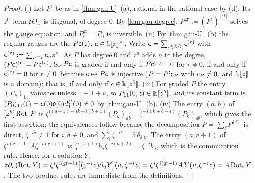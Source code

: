 \begin{proof}
(i) Let $P^\natural$ be as in \cref{thm:gau-U}~(a), rational in the rational case by (d). Its $z^0$-term $\mathfrak d\Theta_U$ is diagonal, of degree $0$. By \cref{lem:gau-degree}, $P^{\mathrm{gr}}:=(P^\natural)^{[0]}$ solves the gauge equation, and $P^{\mathrm{gr}}_0=P^\natural_0$ is invertible. (ii) By \cref{thm:gau-U}~(b) the regular gauges are the $P\mathsf{c}(z)$, $\mathsf{c}\in\Bbbk[\![ z ]\!]^\times$. Write $\mathsf{c}=\sum_{r\in\mathbb{Z}/5}\mathsf{c}^{(r)}$ with $\mathsf{c}^{(r)}:=\sum_{n\equiv r}\mathsf{c}_nz^n$. As $P$ has degree $0$ and $z^n$ adds $n$ to the degree, $(P\mathsf{c})^{[r]}=P\mathsf{c}^{(r)}$. So $P\mathsf{c}$ is graded if and only if $P\mathsf{c}^{(r)}=0$ for $r\neq0$, if and only if $\mathsf{c}^{(r)}=0$ for $r\neq0$, because $\mathsf{c}\mapsto P\mathsf{c}$ is injective ($P=P^\natural\mathsf{c}_P$ with $\mathsf{c}_P\neq0$, and $\Bbbk[\![ z ]\!]$ is a domain); that is, if and only if $\mathsf{c}\in\Bbbk[\![ z^5 ]\!]$. (iii) For graded $P$ the entry $(P_k)_{11}$ vanishes unless $1\equiv1+k$, so $P_{11}(0,z)\in\Bbbk[\![ z^5 ]\!]$, and its constant term is $(P_0)_{11}(0)=\mathsf{c}(0)\mathfrak d(0)d^U_1(0)\neq0$ by \cref{thm:gau-U}~(b). (iv) The entry $(a,b)$ of $[z^k]\operatorname{Rot}_iP$ is $\zeta^{i(a+1)-ik-i(b+1)}(P_k)_{ab}=\zeta^{-i(k+b-a)}(P_k)_{ab}$, which gives the first assertion; the equivalences follow because the decomposition $P=\sum_\delta P^{[\delta]}$ is direct, $\zeta^{-i\delta}\neq1$ for $i,\delta\not\equiv0$, and $\sum_i\zeta^{-i\delta}=5\,\delta_{\delta,0}$. The entry $(a,a+1)$ of $\zeta^{i(\mathrm{gr}+1)}A\zeta^{-i(\mathrm{gr}+1)}$ is $\zeta^{i(a+1)}b_a\zeta^{-i(a+2)}=\zeta^{-i}b_a$, which is the commutation rule. Hence, for a solution $Y$, $z\partial_u(\operatorname{Rot}_iY)=\zeta^i\zeta^{i(\mathrm{gr}+1)}\bigl[(\zeta^{-i}z)\partial_uY\bigr](u,\zeta^{-i}z)=\zeta^i\zeta^{i(\mathrm{gr}+1)}A\,Y(u,\zeta^{-i}z)=A\operatorname{Rot}_iY$. The two product rules are immediate from the definitions.
\end{proof}

